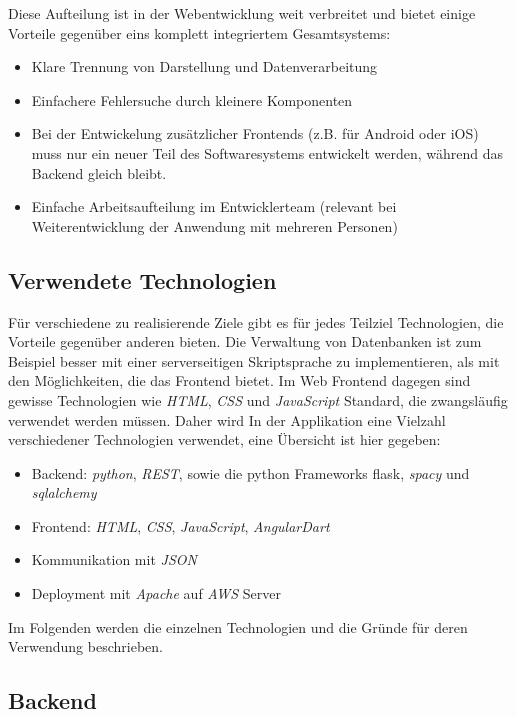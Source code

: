 
Diese Aufteilung ist in der Webentwicklung weit verbreitet  und bietet einige Vorteile gegenüber eins komplett integriertem Gesamtsystems:

\begin{itemize}
	\item Klare Trennung von Darstellung und Datenverarbeitung
	\item Einfachere Fehlersuche durch kleinere Komponenten
	\item Bei der Entwickelung zusätzlicher Frontends (z.B. für Android oder iOS) muss nur ein neuer Teil des Softwaresystems entwickelt werden, während das Backend gleich bleibt.
	\item Einfache Arbeitsaufteilung im Entwicklerteam (relevant bei Weiterentwicklung der Anwendung mit mehreren Personen)
\end{itemize}

\subsection{Verwendete Technologien}
Für verschiedene zu realisierende Ziele gibt es für jedes Teilziel Technologien, die Vorteile gegenüber anderen bieten. Die Verwaltung von Datenbanken ist zum Beispiel besser mit einer serverseitigen Skriptsprache zu implementieren, als mit den Möglichkeiten, die das Frontend bietet. Im Web Frontend dagegen sind gewisse Technologien wie \textit{HTML}, \textit{CSS} und \textit{JavaScript} Standard, die zwangsläufig verwendet werden müssen. Daher wird In der Applikation eine Vielzahl verschiedener Technologien verwendet, eine Übersicht ist hier gegeben:

\begin{itemize}
	\item Backend: \textit{python}, \textit{REST}, sowie die python Frameworks fla\textit{}sk, \textit{spacy} und \textit{sqlalchemy}
	\item Frontend: \textit{HTML}, \textit{CSS}, \textit{JavaScript}, \textit{AngularDart}
	\item Kommunikation mit \textit{JSON}
	\item Deployment mit \textit{Apache} auf \textit{AWS} Server
\end{itemize}

Im Folgenden werden die einzelnen Technologien und die Gründe für deren Verwendung beschrieben.

\subsection{Backend}

